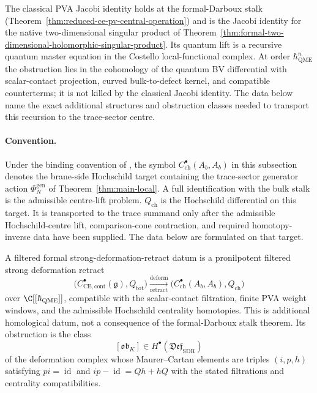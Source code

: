 The classical PVA Jacobi identity holds at the formal-Darboux stalk
(Theorem~\ref{thm:reduced-ce-pv-central-operation}) and is the Jacobi
identity for the native two-dimensional singular product of
Theorem~\ref{thm:formal-two-dimensional-holomorphic-singular-product}.  Its quantum
lift is a recursive quantum master equation in the Costello
local-functional complex.  At order \(\hbar_{\mathrm{QME}}^n\) the obstruction lies in
the cohomology of the quantum BV differential with scalar-contact
projection, curved bulk-to-defect kernel, and compatible counterterms;
it is not killed by the classical Jacobi identity.  The data below name
the exact additional structures and obstruction classes needed to
transport this recursion to the trace-sector centre.

\paragraph{Convention.}
Under the binding convention of
, the symbol
$C^\bullet_{\mathrm{ch}}(A_b,A_b)$ in this subsection denotes the
brane-side Hochschild target containing the trace-sector generator
action \(\Phi_N^{\mathrm{gen}}\) of Theorem~\ref{thm:main-local}.  A
full identification with the bulk stalk is the admissible centre-lift
problem.
\(Q_{\mathrm{ch}}\) is the Hochschild differential on this target.  It
is transported to the trace summand only after the admissible
Hochschild-centre lift, comparison-cone contraction, and required
homotopy-inverse data have been supplied.  The data below are formulated
on that target.

\begin{defn}\label{app:hyp:KZ-SDR}
A filtered formal strong-deformation-retract datum is a pronilpotent
filtered strong deformation retract
\[
  \bigl(C^\bullet_{\mathrm{CE},\mathrm{cont}}(\mathfrak g),Q_{\mathrm{tot}}\bigr)
   \xrightarrow[\text{retract}]{\text{deform}}
   \bigl(C^\bullet_{\mathrm{ch}}(A_b,A_b),Q_{\mathrm{ch}}\bigr)
\]
over \(\C[[\hbar_{\mathrm{QME}}]]\), compatible with the scalar-contact filtration,
finite PVA weight windows, and the admissible Hochschild centrality
homotopies.  This is additional homological datum, not a consequence of
the formal-Darboux stalk theorem.  Its obstruction is the class
\[
  [\mathfrak{ob}_K]\in
  H^\bullet(\mathfrak{Def}_{\mathrm{SDR}})
\]
of the deformation complex whose Maurer--Cartan elements are triples
\((i,p,h)\) satisfying \(pi=\operatorname{id}\) and
\(ip-\operatorname{id}=Qh+hQ\) with the stated filtrations and
centrality compatibilities.
\end{defn}

